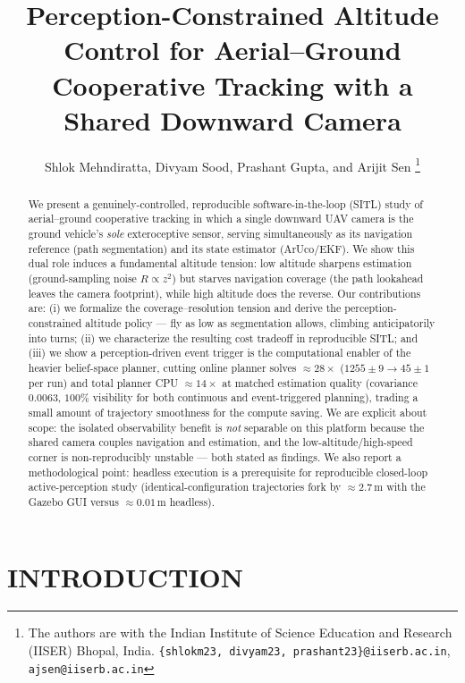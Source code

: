 \documentclass[letterpaper, 10 pt, conference]{ieeeconf}  %
\title{\LARGE \bf
Perception-Constrained Altitude Control for Aerial--Ground \\
Cooperative Tracking with a Shared Downward Camera
}
\author{Shlok Mehndiratta, Divyam Sood, Prashant Gupta, and Arijit Sen%
\thanks{The authors are with the Indian Institute of Science Education and
Research (IISER) Bhopal, India.
{\tt\small \{shlokm23, divyam23, prashant23\}@iiserb.ac.in},
{\tt\small ajsen@iiserb.ac.in}}%
}
\newcommand{\RESsolvesCone}{\ensuremath{1255\pm9}}\newcommand{\RESsolvesCthree}{\ensuremath{45\pm1}}
\newcommand{\REScov}{\ensuremath{0.0063}}\newcommand{\RESsolveRed}{28}\newcommand{\REScpuRed}{14}
\newcommand{\RESforkGUI}{2.7}\newcommand{\RESforkHL}{0.01}
\begin{document}
\maketitle
\thispagestyle{empty}
\pagestyle{empty}


\begin{abstract}
We present a genuinely-controlled, reproducible software-in-the-loop (SITL) study of
aerial--ground cooperative tracking in which a single downward UAV camera is the ground
vehicle's \emph{sole} exteroceptive sensor, serving simultaneously as its navigation
reference (path segmentation) and its state estimator (ArUco/EKF). We show this dual role
induces a fundamental altitude tension: low altitude sharpens estimation (ground-sampling
noise $R\propto z^2$) but starves navigation coverage (the path lookahead leaves the camera
footprint), while high altitude does the reverse. Our contributions are: (i) we formalize the
coverage--resolution tension and derive the perception-constrained altitude policy --- fly as
low as segmentation allows, climbing anticipatorily into turns; (ii) we characterize the
resulting cost tradeoff in reproducible SITL; and (iii) we show a perception-driven event
trigger is the computational enabler of the heavier belief-space planner, cutting online
planner solves $\approx\!\RESsolveRed\times$ ($\RESsolvesCone\!\to\!\RESsolvesCthree$ per run)
and total planner CPU $\approx\!\REScpuRed\times$ at matched estimation quality (covariance
$\REScov$, $100\%$ visibility for both continuous and event-triggered planning), trading a
small amount of trajectory smoothness for the compute saving. We are explicit about scope: the
isolated observability benefit is \emph{not} separable on this platform because the shared
camera couples navigation and estimation, and the low-altitude/high-speed corner is
non-reproducibly unstable --- both stated as findings. We also report a methodological point:
headless execution is a prerequisite for reproducible closed-loop active-perception study
(identical-configuration trajectories fork by $\approx\!\RESforkGUI$\,m with the Gazebo GUI
versus $\approx\!\RESforkHL$\,m headless).
\end{abstract}


\section{INTRODUCTION}
\end{document}
